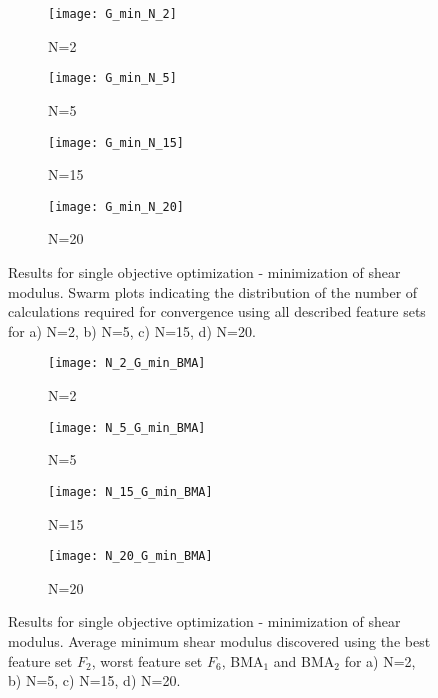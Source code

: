 \documentclass[preprint,amsmath,amssymb,aps, prb,showkeys]{revtex4-1}
\begin{document}
\begin{figure}[htp]
        \parbox{.975\textwidth}{
            \begin{subfigure}{.475\linewidth}
                \texttt{[image: G\_min\_N\_2]}
                \caption{N=2}
                \label{fig:Min_G_N_2_swarm}
        \end{subfigure}
            \begin{subfigure}{.475\linewidth}
                \texttt{[image: G\_min\_N\_5]}
                \caption{N=5}
                \label{fig:Min_G_N_5_swarm}
        \end{subfigure}
            \begin{subfigure}{.475\linewidth}
                \texttt{[image: G\_min\_N\_15]}
                \caption{N=15}
                \label{fig:Min_G_N_15_swarm}
        \end{subfigure}
            \begin{subfigure}{.475\linewidth}
                \texttt{[image: G\_min\_N\_20]}
                \caption{N=20}
                \label{fig:Min_G_N_20_swarm}
        \end{subfigure}
        }
        \caption{ Results for single objective optimization - minimization of shear modulus. Swarm plots indicating the distribution of the number of calculations required for convergence using all described feature sets for a) N=2, b) N=5, c) N=15, d) N=20.}
        \label{fig:Min_G_modulus_swarm}
        
\end{figure}

\begin{figure}[htp]
        \parbox{.975\textwidth}{
            \begin{subfigure}{.475\linewidth}
                \texttt{[image: N\_2\_G\_min\_BMA]}
                \caption{N=2}
                \label{fig:Min_G_N_2_BMA}
        \end{subfigure}
            \begin{subfigure}{.475\linewidth}
                \texttt{[image: N\_5\_G\_min\_BMA]}
                \caption{N=5}
                \label{fig:Min_G_N_5_BMA}
        \end{subfigure}
            \begin{subfigure}{.475\linewidth}
                \texttt{[image: N\_15\_G\_min\_BMA]}
                \caption{N=15}
                \label{fig:Min_G_N_15_BMA}
        \end{subfigure}
            \begin{subfigure}{.475\linewidth}
                \texttt{[image: N\_20\_G\_min\_BMA]}
                \caption{N=20}
                \label{fig:Min_G_N_20_BMA}
        \end{subfigure}
        }
        \caption{ Results for single objective optimization - minimization of shear modulus. Average minimum shear modulus discovered using the best feature set $F_2$, worst feature set $F_6$, BMA$_1$ and BMA$_2$ for a) N=2, b) N=5, c) N=15, d) N=20.}
        \label{fig:Min_G_single_BMA}       
\end{figure} 
\end{document}
